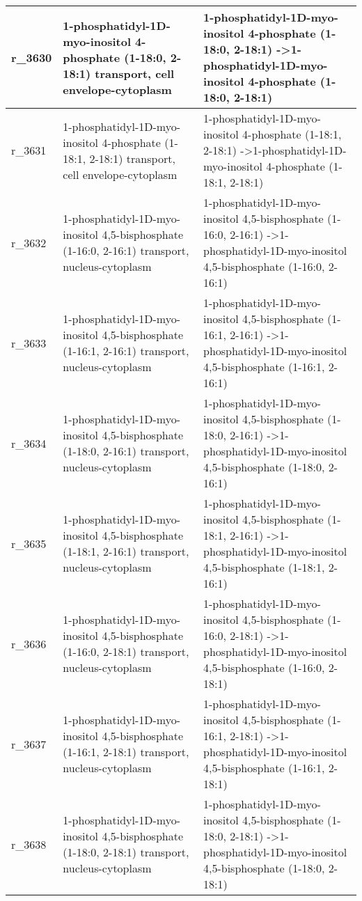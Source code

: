 \begin{landscape}
{\begin{longtable}{|l|p{7cm}|p{15cm}|}
r\_3630 & 1-phosphatidyl-1D-myo-inositol 4-phosphate (1-18:0, 2-18:1) transport, cell envelope-cytoplasm & 1-phosphatidyl-1D-myo-inositol 4-phosphate (1-18:0, 2-18:1)  -\textgreater 1-phosphatidyl-1D-myo-inositol 4-phosphate (1-18:0, 2-18:1) \\ \hline
r\_3631 & 1-phosphatidyl-1D-myo-inositol 4-phosphate (1-18:1, 2-18:1) transport, cell envelope-cytoplasm & 1-phosphatidyl-1D-myo-inositol 4-phosphate (1-18:1, 2-18:1)  -\textgreater 1-phosphatidyl-1D-myo-inositol 4-phosphate (1-18:1, 2-18:1) \\ \hline
r\_3632 & 1-phosphatidyl-1D-myo-inositol 4,5-bisphosphate (1-16:0, 2-16:1) transport, nucleus-cytoplasm & 1-phosphatidyl-1D-myo-inositol 4,5-bisphosphate (1-16:0, 2-16:1)  -\textgreater 1-phosphatidyl-1D-myo-inositol 4,5-bisphosphate (1-16:0, 2-16:1) \\ \hline
r\_3633 & 1-phosphatidyl-1D-myo-inositol 4,5-bisphosphate (1-16:1, 2-16:1) transport, nucleus-cytoplasm & 1-phosphatidyl-1D-myo-inositol 4,5-bisphosphate (1-16:1, 2-16:1)  -\textgreater 1-phosphatidyl-1D-myo-inositol 4,5-bisphosphate (1-16:1, 2-16:1) \\ \hline
r\_3634 & 1-phosphatidyl-1D-myo-inositol 4,5-bisphosphate (1-18:0, 2-16:1) transport, nucleus-cytoplasm & 1-phosphatidyl-1D-myo-inositol 4,5-bisphosphate (1-18:0, 2-16:1)  -\textgreater 1-phosphatidyl-1D-myo-inositol 4,5-bisphosphate (1-18:0, 2-16:1) \\ \hline
r\_3635 & 1-phosphatidyl-1D-myo-inositol 4,5-bisphosphate (1-18:1, 2-16:1) transport, nucleus-cytoplasm & 1-phosphatidyl-1D-myo-inositol 4,5-bisphosphate (1-18:1, 2-16:1)  -\textgreater 1-phosphatidyl-1D-myo-inositol 4,5-bisphosphate (1-18:1, 2-16:1) \\ \hline
r\_3636 & 1-phosphatidyl-1D-myo-inositol 4,5-bisphosphate (1-16:0, 2-18:1) transport, nucleus-cytoplasm & 1-phosphatidyl-1D-myo-inositol 4,5-bisphosphate (1-16:0, 2-18:1)  -\textgreater 1-phosphatidyl-1D-myo-inositol 4,5-bisphosphate (1-16:0, 2-18:1) \\ \hline
r\_3637 & 1-phosphatidyl-1D-myo-inositol 4,5-bisphosphate (1-16:1, 2-18:1) transport, nucleus-cytoplasm & 1-phosphatidyl-1D-myo-inositol 4,5-bisphosphate (1-16:1, 2-18:1)  -\textgreater 1-phosphatidyl-1D-myo-inositol 4,5-bisphosphate (1-16:1, 2-18:1) \\ \hline
r\_3638 & 1-phosphatidyl-1D-myo-inositol 4,5-bisphosphate (1-18:0, 2-18:1) transport, nucleus-cytoplasm & 1-phosphatidyl-1D-myo-inositol 4,5-bisphosphate (1-18:0, 2-18:1)  -\textgreater 1-phosphatidyl-1D-myo-inositol 4,5-bisphosphate (1-18:0, 2-18:1) \\ \hline

\end{longtable}}
\end{landscape}

